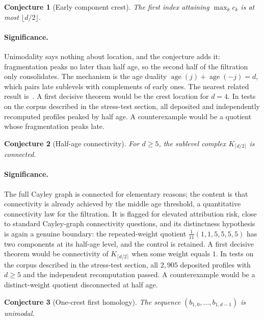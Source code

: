 \documentclass[11pt]{article}
\newtheorem{conjecture}{Conjecture}
\theoremstyle{definition}
\begin{document}
\begin{conjecture}[Early component crest]\label{z7}
The first index attaining $\max_kc_k$ is at most $\lfloor d/2\rfloor$.
\end{conjecture}

\paragraph{Significance.}
Unimodality says nothing about location, and the conjecture adds it: fragmentation peaks no later than half age, so the second half of the filtration only consolidates.  The mechanism is the age duality $\operatorname{age}(j)+\operatorname{age}(-j)=d$, which pairs late sublevels with complements of early ones.  The nearest related result is~\cite{Reid02}.  A first decisive theorem would be the crest location for $d=4$.  In tests on the corpus described in the stress-test section, all deposited and independently recomputed profiles peaked by half age.  A counterexample would be a quotient whose fragmentation peaks late.

\begin{conjecture}[Half-age connectivity]\label{z8}
For $d\ge5$, the sublevel complex $K_{\lceil d/2\rceil}$ is connected.
\end{conjecture}

\paragraph{Significance.}
The full Cayley graph is connected for elementary reasons; the content is that connectivity is already achieved by the middle age threshold, a quantitative connectivity law for the filtration.  It is flagged for elevated attribution risk, close to standard Cayley-graph connectivity questions, and its distinctness hypothesis is again a genuine boundary: the repeated-weight quotient $\tfrac1{11}(1,1,5,5,5,5)$ has two components at its half-age level, and the control is retained.  A first decisive theorem would be connectivity of $K_{\lceil d/2\rceil}$ when some weight equals $1$.  In tests on the corpus described in the stress-test section, all $2{,}905$ deposited profiles with $d\ge5$ and the independent recomputation passed.  A counterexample would be a distinct-weight quotient disconnected at half age.

\begin{conjecture}[One-crest first homology]\label{z9}
The sequence $(b_{1,0},\ldots,b_{1,d-1})$ is unimodal.
\end{conjecture}
\end{document}
